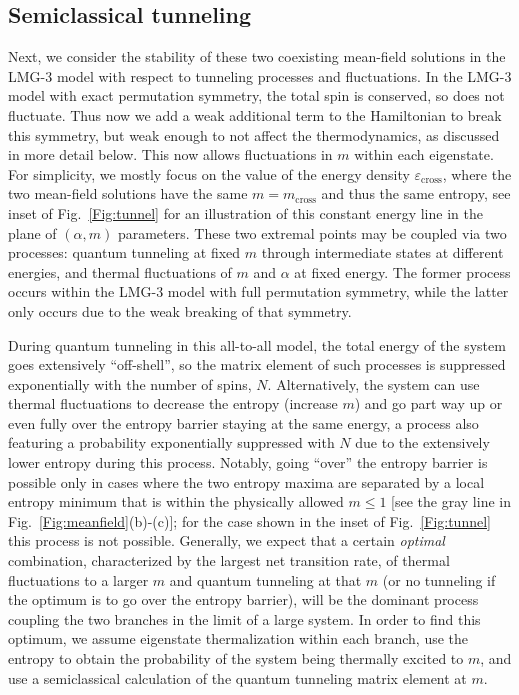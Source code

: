 \documentclass[aps,prx,showpacs,amsmath,amssymb,superscriptaddress,twocolumn,longbibliography,10pt,nofootinbib]{revtex4-2}
\begin{document}
\subsection{Semiclassical tunneling}
Next, we consider the stability of these two coexisting mean-field solutions in the LMG-3 model with respect to tunneling processes and fluctuations.  In the LMG-3 model with exact permutation symmetry, the total spin is conserved, so does not fluctuate.  Thus now we add a weak additional term to the Hamiltonian to break this symmetry, but weak enough to not affect the thermodynamics, as discussed in more detail below.  This now allows fluctuations in $m$ within each eigenstate.  For simplicity, we mostly focus on the value of the energy density $\varepsilon_\text{cross}$, where the two mean-field solutions have the same $m=m_\text{cross}$ and thus the same entropy, see inset of Fig.~\ref{Fig:tunnel} for an illustration of this constant energy line in the plane of $(\alpha,m)$ parameters. These two extremal points may be coupled via two processes: quantum tunneling at fixed $m$ through intermediate states at different energies, and thermal fluctuations of $m$ and $\alpha$ at fixed energy.  The former process occurs within the LMG-3 model with full permutation symmetry, while the latter only occurs due to the weak breaking of that symmetry.

During quantum tunneling in this all-to-all model, the total energy of the system goes extensively ``off-shell'', so the matrix element of such processes is suppressed exponentially with the number of spins, $N$. Alternatively, the system can use thermal fluctuations to decrease the entropy (increase $m$) and go part way up or even fully over the entropy barrier staying at the same energy, a process also featuring a probability exponentially suppressed with $N$ due to the extensively lower entropy during this process.  Notably, going ``over'' the entropy barrier is possible only in cases where the two entropy maxima are separated by a local entropy minimum that is within the physically allowed $m\leq 1$ [see the gray line in Fig.~\ref{Fig:meanfield}(b)-(c)]; for the case shown in the inset of Fig.~\ref{Fig:tunnel} this process is not possible.  Generally, we expect that a certain \emph{optimal} combination, characterized by the largest net transition rate, of thermal fluctuations to a larger $m$ and quantum tunneling at that $m$ (or no tunneling if the optimum is to go over the entropy barrier),  will be the dominant process coupling the two branches in the limit of a large system. In order to find this optimum, we assume eigenstate thermalization within each branch, use the entropy to obtain the probability of the system being thermally excited to $m$, and use a semiclassical calculation of the quantum tunneling matrix element at $m$. 
\end{document}
